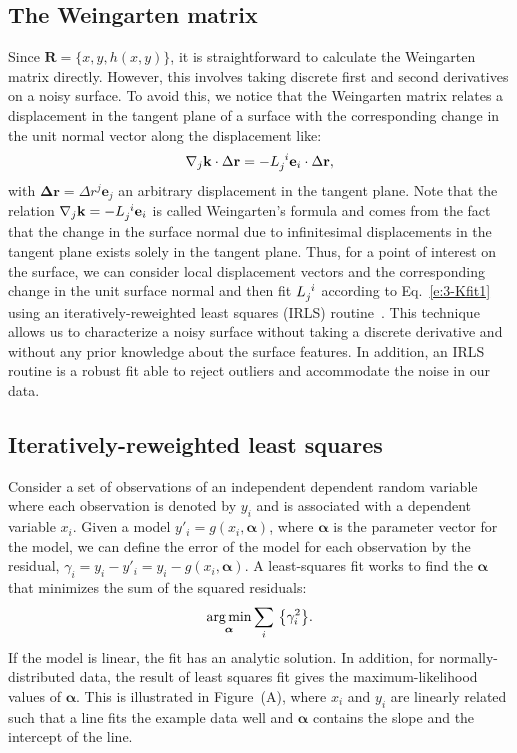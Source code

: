\subsection{The Weingarten matrix}
Since $\mathbf{R} = \{x, y, h(x,y)\}$, it is straightforward to calculate the Weingarten matrix directly.
However, this involves taking discrete first and second derivatives on a noisy surface.
To avoid this, we notice that the Weingarten matrix relates a displacement in the tangent plane of a surface with the corresponding change in the unit normal vector along the displacement like:
\begin{equation}
\nabla_j \mathbf{k} \cdot \Delta \mathbf{r} = -\tensor{L}{_j^i} \mathbf{e}_i \cdot \Delta \mathbf{r},\label{e:3-Kfit1}
\end{equation}
with $\mathbf{\Delta r} = \Delta r^j \mathbf{e}_j$ an arbitrary displacement in the tangent plane.
Note that the relation $\nabla_j \mathbf{k} = -\tensor{L}{_j^i} \mathbf{e}_i$ is called Weingarten's formula and comes from the fact that the change in the surface normal due to infinitesimal displacements in the tangent plane exists solely in the tangent plane.
Thus, for a point of interest on the surface, we can consider local displacement vectors and the corresponding change in the unit surface normal and then fit $\tensor{L}{_j^i}$ according to Eq.~\ref{e:3-Kfit1} using an iteratively-reweighted least squares (IRLS) routine~\cite{RN32,RN31}.
This technique allows us to characterize a noisy surface without taking a discrete derivative and without any prior knowledge about the surface features.
In addition, an IRLS routine is a robust fit able to reject outliers and accommodate the noise in our data.


\subsection{Iteratively-reweighted least squares}
Consider a set of observations of an independent dependent random variable where each observation is denoted by $y_i$ and is associated with a dependent variable $x_i$.
Given a model $y'_i = g(x_i,\bm{\alpha})$, where $\bm{\alpha}$ is the parameter vector for the model, we can define the error of the model for each observation by the residual, $\gamma_i = y_i - y'_i = y_i - g(x_i,\bm{\alpha})$.
A least-squares fit works to find the $\bm{\alpha}$ that minimizes the sum of the squared residuals:
\begin{equation}
  \operatorname*{arg\,min}_{\bm{\alpha}} \sum\limits_i\, \big \{ \gamma_i^2\big \}.\label{e:3-LeastSquare}
\end{equation}
If the model is linear, the fit has an analytic solution.
In addition, for normally-distributed data, the result of least squares fit gives the maximum-likelihood values of $\bm{\alpha}$.
This is illustrated in Figure~(A), where $x_i$ and $y_i$ are linearly related such that a line fits the example data well and $\bm{\alpha}$ contains the slope and the intercept of the line.\\

